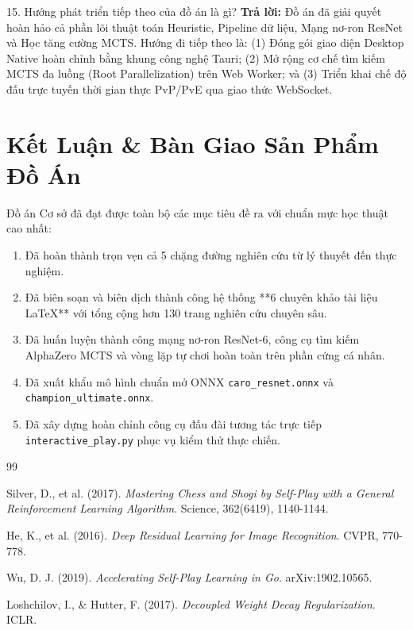 \documentclass[12pt,a4paper,oneside]{report}
\begin{document}
\begin{defensebox}{15. Hướng phát triển tiếp theo của đồ án là gì?}
\textbf{Trả lời:} Đồ án đã giải quyết hoàn hảo cả phần lõi thuật toán Heuristic, Pipeline dữ liệu, Mạng nơ-ron ResNet và Học tăng cường MCTS. Hướng đi tiếp theo là: (1) Đóng gói giao diện Desktop Native hoàn chỉnh bằng khung công nghệ Tauri; (2) Mở rộng cơ chế tìm kiếm MCTS đa luồng (Root Parallelization) trên Web Worker; và (3) Triển khai chế độ đấu trực tuyến thời gian thực PvP/PvE qua giao thức WebSocket.
\end{defensebox}

\chapter{Kết Luận \& Bàn Giao Sản Phẩm Đồ Án}

Đồ án Cơ sở đã đạt được toàn bộ các mục tiêu đề ra với chuẩn mực học thuật cao nhất:
\begin{enumerate}
    \item Đã hoàn thành trọn vẹn cả 5 chặng đường nghiên cứu từ lý thuyết đến thực nghiệm.
    \item Đã biên soạn và biên dịch thành công hệ thống **6 chuyên khảo tài liệu LaTeX** với tổng cộng hơn 130 trang nghiên cứu chuyên sâu.
    \item Đã huấn luyện thành công mạng nơ-ron ResNet-6, công cụ tìm kiếm AlphaZero MCTS và vòng lặp tự chơi hoàn toàn trên phần cứng cá nhân.
    \item Đã xuất khẩu mô hình chuẩn mở ONNX \texttt{caro\_resnet.onnx} và \texttt{champion\_ultimate.onnx}.
    \item Đã xây dựng hoàn chỉnh công cụ đấu đài tương tác trực tiếp \texttt{interactive\_play.py} phục vụ kiểm thử thực chiến.
\end{enumerate}

\begin{thebibliography}{99}

Silver, D., et al. (2017). \textit{Mastering Chess and Shogi by Self-Play with a General Reinforcement Learning Algorithm}. Science, 362(6419), 1140-1144.

He, K., et al. (2016). \textit{Deep Residual Learning for Image Recognition}. CVPR, 770-778.

Wu, D. J. (2019). \textit{Accelerating Self-Play Learning in Go}. arXiv:1902.10565.

Loshchilov, I., \& Hutter, F. (2017). \textit{Decoupled Weight Decay Regularization}. ICLR.

\end{thebibliography}
\end{document}
